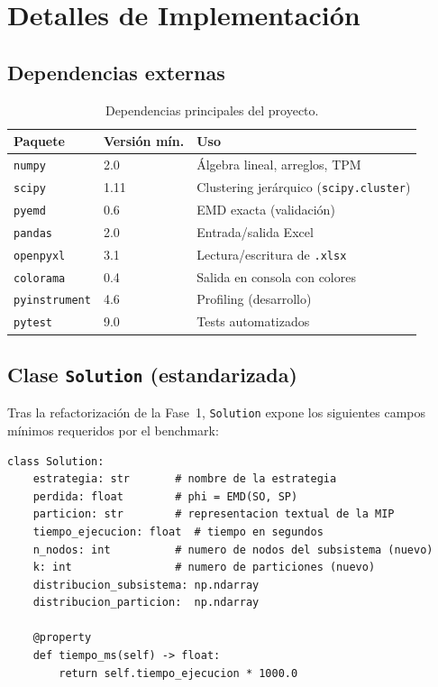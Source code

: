 \documentclass[11pt,letterpaper]{article}
\begin{document}
\section{Detalles de Implementación}
\label{sec:implementacion}

\subsection{Dependencias externas}

\begin{table}[H]
  \centering
  \caption{Dependencias principales del proyecto.}
  \begin{tabular}{l l l}
    \toprule
    Paquete & Versión mín. & Uso \\
    \midrule
    \texttt{numpy}      & 2.0   & Álgebra lineal, arreglos, TPM \\
    \texttt{scipy}      & 1.11  & Clustering jerárquico (\texttt{scipy.cluster}) \\
    \texttt{pyemd}      & 0.6   & EMD exacta (validación) \\
    \texttt{pandas}     & 2.0   & Entrada/salida Excel \\
    \texttt{openpyxl}   & 3.1   & Lectura/escritura de \texttt{.xlsx} \\
    \texttt{colorama}   & 0.4   & Salida en consola con colores \\
    \texttt{pyinstrument} & 4.6 & Profiling (desarrollo) \\
    \texttt{pytest}     & 9.0   & Tests automatizados \\
    \bottomrule
  \end{tabular}
\end{table}

\subsection{Clase \texttt{Solution} (estandarizada)}

Tras la refactorización de la Fase~1, \texttt{Solution} expone los siguientes
campos mínimos requeridos por el benchmark:

\begin{lstlisting}[caption={Campos de Solution tras estandarización.}]
class Solution:
    estrategia: str       # nombre de la estrategia
    perdida: float        # phi = EMD(SO, SP)
    particion: str        # representacion textual de la MIP
    tiempo_ejecucion: float  # tiempo en segundos
    n_nodos: int          # numero de nodos del subsistema (nuevo)
    k: int                # numero de particiones (nuevo)
    distribucion_subsistema: np.ndarray
    distribucion_particion:  np.ndarray

    @property
    def tiempo_ms(self) -> float:
        return self.tiempo_ejecucion * 1000.0
\end{lstlisting}
\end{document}
